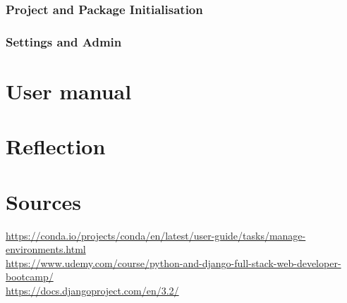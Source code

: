 \documentclass[a4paper, 12pt, titlepage]{report}
\begin{document}
\subsection{Project and Package Initialisation}
\subsection{Settings and Admin}
\chapter{User manual}
\chapter{Reflection}
\chapter{Sources}
\url{https://conda.io/projects/conda/en/latest/user-guide/tasks/manage-environments.html}\\
\url{https://www.udemy.com/course/python-and-django-full-stack-web-developer-bootcamp/}\\
\url{https://docs.djangoproject.com/en/3.2/}
\end{document}
